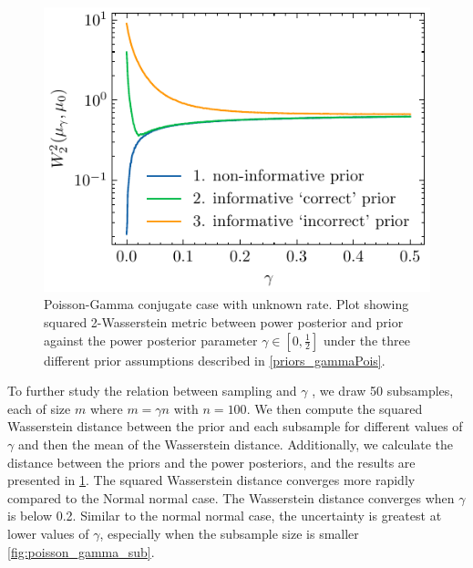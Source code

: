 \documentclass[12pt]{article}
\begin{document}
\begin{figure}[htbp]
    \begin{center}
   \includegraphics{imgs/poisson_gammawasserstein_distance.pdf}
       \end{center}
        \label{fig:pois_gama_was}
    \caption{Poisson-Gamma conjugate case with unknown rate. Plot showing squared
    	2-Wasserstein metric between power posterior and prior against the
    	power posterior parameter $\gamma \in [0, \frac{1}{2}]$ under the three
    	different prior assumptions described in  \cref{priors_gammaPois}.}
    \label{fig:poisson_ga_conju}
\end{figure}


To further study the relation between sampling and $\gamma$ , we draw 50 subsamples, each of size $m$ where $m =\gamma n$ with $n=100$. We then compute the squared Wasserstein distance between the prior and each subsample for different values of $\gamma$ and then the mean of the Wasserstein distance. Additionally, we calculate the distance between the priors and the power posteriors, and the results are presented in \cref{fig:poisson_ga_conju}. The squared Wasserstein distance converges more rapidly compared to the Normal normal case. The Wasserstein distance converges when $\gamma$ is below 0.2. Similar to the normal normal case, the uncertainty is greatest at lower values of $\gamma$, especially when the subsample size is smaller \cref{fig:poisson_gamma_sub}. 
\end{document}
